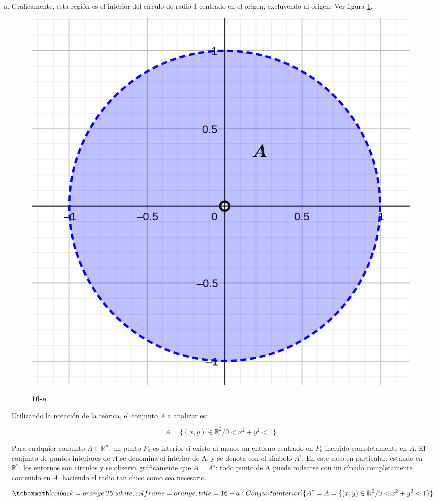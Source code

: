 \documentclass{article}
\renewcommand{\Bbb}{\mathbb}
\begin{document}
\begin{enumerate}[(a)]
\item Gráficamente, esta región es el interior del círculo de radio 1 centrado en el origen, excluyendo al origen. Ver figura \ref{fig:1-16-a}.

\begin{figure}[ht]
\caption{\textbf{16-a}}
\includegraphics[scale=2.5]{img/ejercicios/1/16-a.png} 
\centering
\label{fig:1-16-a}
\end{figure}

Utilizando la notación de la teórica, el conjunto $A$ a analizar es:

\begin{equation}
A = \{ (x,y) \in \Bbb R^2 / 0 < x^2 + y^2 < 1 \}
\end{equation}

Para cualquier conjunto $A \in \Bbb R^n$, un punto $P_0$ es interior si existe al menos un entorno centrado en $P_0$ incluido completamente en $A$. El conjunto de puntos interiores de $A$ se denomina el interior de A, y se denota con el símbolo $A^{\circ}$. En este caso en particular, estando en $\Bbb R^2$, los entornos son círculos y se observa gráficamente que $A = A^{\circ}$: todo punto de A puede rodearse con un círculo completamente contenido en $A$, haciendo el radio tan chico como sea necesario.

\begin{equation}
\tcboxmath[colback=orange!25!white,colframe=orange, title=16-a: Conjunto interior]
{ A^{\circ} = A = \{ (x,y) \in \Bbb R^2 / 0 < x^2 + y^2 < 1 \}  }
\end{equation}


\end{enumerate}
\end{document}
